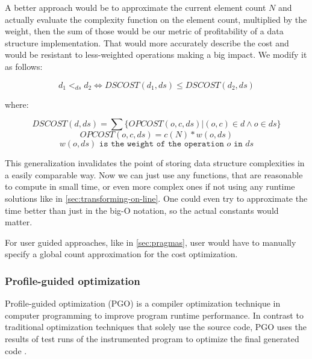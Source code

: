 \documentclass[a4paper,11pt]{article}
\begin{document}
            A better approach would be to approximate the current element count $N$ and actually evaluate the complexity
            function on the element count, multiplied by the weight, then the sum of those would be our metric of
            profitability of a data structure implementation. That would more accurately describe the cost and would be
            resistant to less-weighted operations making a big impact. We modify it as follows:

            \begin{equation} \label{data-structure-order-weights}
                d_1 <_{ds} d_2 \Leftrightarrow DSCOST(d_1, ds) \leq DSCOST(d_2, ds)
            \end{equation}

            where:

            \begin{equation}
                DSCOST(d,ds) = \sum \{OPCOST(o,c,ds) | (o,c) \in d \wedge o \in ds\}
            \end{equation}
            \begin{equation}
                OPCOST(o,c,ds) = c(N) * w(o, ds)
            \end{equation}
            \begin{equation}
                w(o, ds) \texttt{ is the weight of the operation } o \texttt{ in } ds
            \end{equation}

            This generalization invalidates the point of storing data structure complexities in a easily comparable way.
            Now we can just use any functions, that are reasonable to compute in small time, or even more complex ones
            if not using any runtime solutions like in \autoref{sec:transforming-on-line}. One could even try to
            approximate the time better than just in the big-O notation, so the actual constants would matter.

            For user guided approaches, like in \autoref{sec:pragmas}, user would have to manually specify a global
            count approximation for the cost optimization.

		\subsubsection{Profile-guided optimization} \label{sec:pgo}

			Profile-guided optimization (PGO) is a compiler optimization technique in computer programming
			to improve program runtime performance.  In contrast to traditional optimization techniques that
			solely use the source code, PGO uses the results of test runs of the instrumented program to
            optimize the final generated code \cite{Wipgo}.
\end{document}
